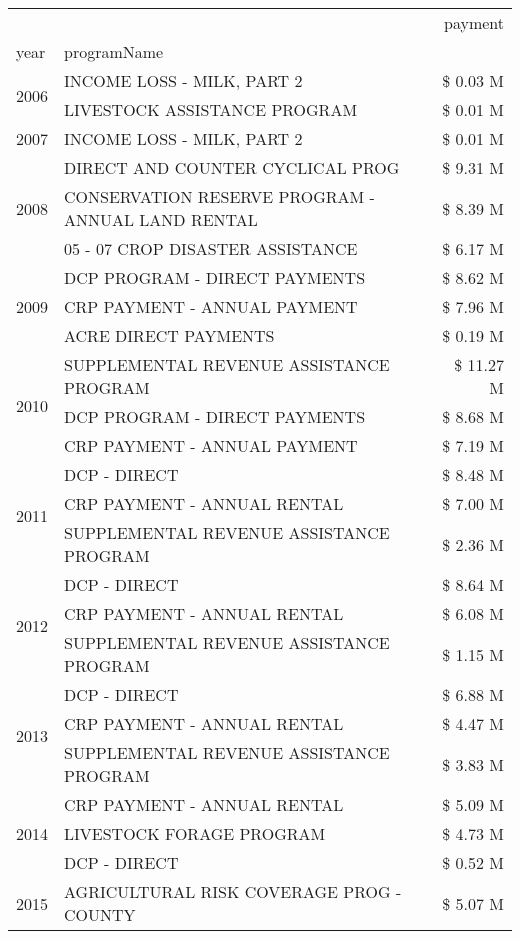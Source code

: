 \begin{tabular}{llr}
\toprule
 &  & payment \\
year & programName &  \\
\midrule
\multirow[t]{2}{*}{2006} & INCOME LOSS - MILK, PART 2 & \$ 0.03 M \\
 & LIVESTOCK ASSISTANCE PROGRAM & \$ 0.01 M \\
\cline{1-3}
2007 & INCOME LOSS - MILK, PART 2 & \$ 0.01 M \\
\cline{1-3}
\multirow[t]{3}{*}{2008} & DIRECT AND COUNTER CYCLICAL PROG & \$ 9.31 M \\
 & CONSERVATION RESERVE PROGRAM - ANNUAL LAND RENTAL & \$ 8.39 M \\
 & 05 - 07 CROP DISASTER ASSISTANCE & \$ 6.17 M \\
\cline{1-3}
\multirow[t]{3}{*}{2009} & DCP PROGRAM - DIRECT PAYMENTS & \$ 8.62 M \\
 & CRP PAYMENT - ANNUAL PAYMENT & \$ 7.96 M \\
 & ACRE DIRECT PAYMENTS & \$ 0.19 M \\
\cline{1-3}
\multirow[t]{3}{*}{2010} & SUPPLEMENTAL REVENUE ASSISTANCE PROGRAM & \$ 11.27 M \\
 & DCP PROGRAM - DIRECT PAYMENTS & \$ 8.68 M \\
 & CRP PAYMENT - ANNUAL PAYMENT & \$ 7.19 M \\
\cline{1-3}
\multirow[t]{3}{*}{2011} & DCP - DIRECT & \$ 8.48 M \\
 & CRP PAYMENT - ANNUAL RENTAL & \$ 7.00 M \\
 & SUPPLEMENTAL REVENUE ASSISTANCE PROGRAM & \$ 2.36 M \\
\cline{1-3}
\multirow[t]{3}{*}{2012} & DCP - DIRECT & \$ 8.64 M \\
 & CRP PAYMENT - ANNUAL RENTAL & \$ 6.08 M \\
 & SUPPLEMENTAL REVENUE ASSISTANCE PROGRAM & \$ 1.15 M \\
\cline{1-3}
\multirow[t]{3}{*}{2013} & DCP - DIRECT & \$ 6.88 M \\
 & CRP PAYMENT - ANNUAL RENTAL & \$ 4.47 M \\
 & SUPPLEMENTAL REVENUE ASSISTANCE PROGRAM & \$ 3.83 M \\
\cline{1-3}
\multirow[t]{3}{*}{2014} & CRP PAYMENT - ANNUAL RENTAL & \$ 5.09 M \\
 & LIVESTOCK FORAGE PROGRAM & \$ 4.73 M \\
 & DCP - DIRECT & \$ 0.52 M \\
\cline{1-3}
\multirow[t]{3}{*}{2015} & AGRICULTURAL RISK COVERAGE PROG - COUNTY & \$ 5.07 M \\

\end{tabular}
